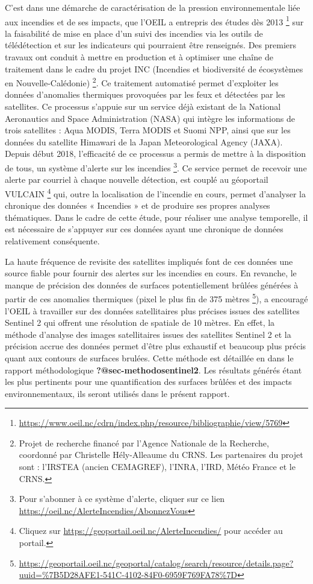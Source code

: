 \documentclass[
  11pt,
  letterpaper,
]{scrreprt}
\begin{document}
C'est dans une démarche de caractérisation de la pression
environnementale liée aux incendies et de ses impacts, que l'OEIL a
entrepris des études dès 2013 \footnote{\url{https://www.oeil.nc/cdrn/index.php/resource/bibliographie/view/5769}}
sur la faisabilité de mise en place d'un suivi des incendies via les
outils de télédétection et sur les indicateurs qui pourraient être
renseignés. Des premiers travaux ont conduit à mettre en production et à
optimiser une chaîne de traitement dans le cadre du projet INC
(Incendies et biodiversité de écosystèmes en Nouvelle-Calédonie)
\footnote{Projet de recherche financé par l'Agence Nationale de la
  Recherche, coordonné par Christelle Hély-Alleaume du CRNS. Les
  partenaires du projet sont : l'IRSTEA (ancien CEMAGREF), l'INRA,
  l'IRD, Météo France et le CRNS.}. Ce traitement automatisé permet
d'exploiter les données d'anomalies thermiques provoquées par les feux
et détectées par les satellites. Ce processus s'appuie sur un service
déjà existant de la National Aeronautics and Space Administration (NASA)
qui intègre les informations de trois satellites : Aqua MODIS, Terra
MODIS et Suomi NPP, ainsi que sur les données du satellite Himawari de
la Japan Meteorological Agency (JAXA). Depuis début 2018, l'efficacité
de ce processus a permis de mettre à la disposition de tous, un système
d'alerte sur les incendies \footnote{Pour s'abonner à ce système
  d'alerte, cliquer sur ce lien
  \url{https://oeil.nc/AlerteIncendies/AbonnezVous}}. Ce service permet
de recevoir une alerte par courriel à chaque nouvelle détection, est
couplé au géoportail VULCAIN \footnote{Cliquez sur
  \url{https://geoportail.oeil.nc/AlerteIncendies/} pour accéder au
  portail.} qui, outre la localisation de l'incendie en cours, permet
d'analyser la chronique des données « Incendies » et de produire ses
propres analyses thématiques. Dans le cadre de cette étude, pour
réaliser une analyse temporelle, il est nécessaire de s'appuyer sur ces
données ayant une chronique de données relativement conséquente.

La haute fréquence de revisite des satellites impliqués font de ces
données une source fiable pour fournir des alertes sur les incendies en
cours. En revanche, le manque de précision des données de surfaces
potentiellement brûlées générées à partir de ces anomalies thermiques
(pixel le plus fin de 375 mètres \footnote{\url{https://geoportail.oeil.nc/geoportal/catalog/search/resource/details.page?uuid=\%7B5D28AFE1-541C-4102-84F0-6959F769FA78\%7D}}),
a encouragé l'OEIL à travailler sur des données satellitaires plus
précises issues des satellites Sentinel 2 qui offrent une résolution de
spatiale de 10 mètres. En effet, la méthode d'analyse des images
satellitaires issues des satellites Sentinel 2 et la précision accrue
des données permet d'être plus exhaustif et beaucoup plus précis quant
aux contours de surfaces brulées. Cette méthode est détaillée en dans le
rapport méthodologique \textbf{?@sec-methodosentinel2}. Les résultats
générés étant les plus pertinents pour une quantification des surfaces
brûlées et des impacts environnementaux, ils seront utilisés dans le
présent rapport.
\end{document}
